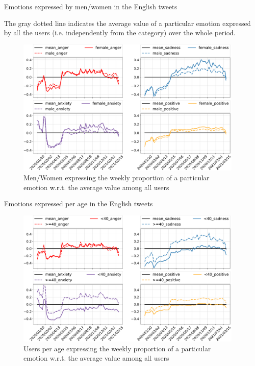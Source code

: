 \documentclass[9pt,aspectratio=1610]{beamer}  %
\begin{document}
\begin{frame}{Emotions expressed by men/women in the English tweets}

    The gray dotted line indicates the average value of a particular emotion expressed by all the users (i.e. independently from the category) over the whole period.

    \begin{figure}[H]
	    \centering
    	\includegraphics[scale=.25]{assets/img/en_4_categories_per_gender_over_mean_subplot.svg.pdf}
    	\caption{Men/Women expressing the weekly proportion of a particular emotion w.r.t. the average value among all users}
    	\label{fig:en-4-categories-per-gender-over-mean}
    \end{figure}
    
\end{frame}

\begin{frame}{Emotions expressed per age in the English tweets}

    \begin{figure}[H]
	    \centering
    	\includegraphics[scale=.30]{assets/img/en_4_categories_per_age_over_mean_subplot.svg.pdf}
    	\caption{Users per age expressing the weekly proportion of a particular emotion w.r.t. the average value among all users}
    	\label{fig:en-4-categories-per-age-over-mean}
    \end{figure}
    
\end{frame}
\end{document}
